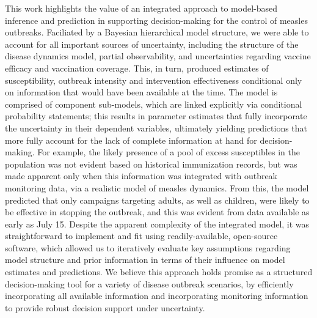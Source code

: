 This work highlights the value of an integrated approach to model-based inference and prediction in supporting decision-making for the control of measles outbreaks. Faciliated by a Bayesian hierarchical model structure, we were able to account for all important sources of uncertainty, including the structure of the disease dynamics model, partial observability, and uncertainties regarding vaccine efficacy and vaccination coverage. This, in turn, produced estimates of susceptibility, outbreak intensity and intervention effectiveness conditional only on information that would have been available at the time. The model is comprised of component sub-models, which are linked explicitly via conditional probability statements; this results in parameter estimates that fully incorporate the uncertainty in their dependent variables, ultimately yielding predictions that more fully account for the lack of complete information at hand for decision-making. For example, the likely presence of a pool of excess susceptibles in the population was not evident based on historical immunization records, but was made apparent only when this information was integrated with outbreak monitoring data, via a realistic model of measles dynamics. From this, the model predicted that only campaigns targeting adults, as well as children, were likely to be effective in stopping the outbreak, and this was evident from data available as early as July 15. Despite the apparent complexity of the integrated model, it was straightforward to implement and fit using readily-available, open-source software, which allowed us to iteratively evaluate key assumptions regarding model structure and prior information in terms of their influence on model estimates and predictions. We believe this approach holds promise as a structured decision-making tool for a variety of disease outbreak scenarios, by efficiently incorporating all available information and incorporating monitoring information to provide robust decision support under uncertainty.

